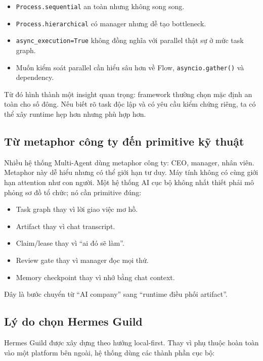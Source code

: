 \documentclass[12pt,a4paper]{article}
\begin{document}
\begin{itemize}
    \item \texttt{Process.sequential} an toàn nhưng không song song.
    \item \texttt{Process.hierarchical} có manager nhưng dễ tạo bottleneck.
    \item \texttt{async\_execution=True} không đồng nghĩa với parallel thật sự ở mức task graph.
    \item Muốn kiểm soát parallel cần hiểu sâu hơn về Flow, \texttt{asyncio.gather()} và dependency.
\end{itemize}

Từ đó hình thành một insight quan trọng: framework thường chọn mặc định an toàn cho số đông. Nếu biết rõ task độc lập và có yêu cầu kiểm chứng riêng, ta có thể xây runtime hẹp hơn nhưng phù hợp hơn.

\subsection{Từ metaphor công ty đến primitive kỹ thuật}

Nhiều hệ thống Multi-Agent dùng metaphor công ty: CEO, manager, nhân viên. Metaphor này dễ hiểu nhưng có thể giới hạn tư duy. Máy tính không có cùng giới hạn attention như con người. Một hệ thống AI cục bộ không nhất thiết phải mô phỏng sơ đồ tổ chức; nó cần primitive đúng:

\begin{itemize}
    \item Task graph thay vì lời giao việc mơ hồ.
    \item Artifact thay vì chat transcript.
    \item Claim/lease thay vì ``ai đó sẽ làm''.
    \item Review gate thay vì manager đọc mọi thứ.
    \item Memory checkpoint thay vì nhớ bằng chat context.
\end{itemize}

Đây là bước chuyển từ ``AI company'' sang ``runtime điều phối artifact''.

\subsection{Lý do chọn Hermes Guild}

Hermes Guild được xây dựng theo hướng local-first. Thay vì phụ thuộc hoàn toàn vào một platform bên ngoài, hệ thống dùng các thành phần cục bộ:
\end{document}
